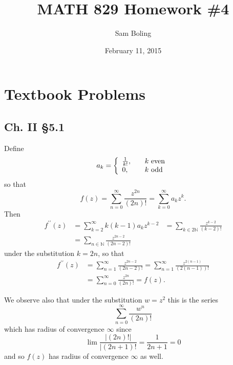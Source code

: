 \documentclass{article}
\title{MATH 829 Homework \#4}
\date{February 11, 2015}
\author{Sam Boling}
\newcounter{Problem}
\begin{document}
\begin{titlepage}
\maketitle
\end{titlepage}

\section{Textbook Problems}

\subsection*{Ch. II \S 5.1}
Define
$$
a_k
=
\left\{\begin{array}{l l}
  \frac{1}{k!}, & \quad k \text{ even} \\
  0,            & \quad k \text{ odd}
\end{array}\right.
$$
so that
$$
f(z) = \sum_{n=0}^{\infty} \frac{z^{2n}}{(2n)!} = \sum_{k=0}^\infty a_k z^k.
$$
Then
\begin{align*}
   f^{\prime\prime}(z)
&= \sum_{k=2}^\infty k (k-1) a_k z^{k-2}
&= \sum_{k \in 2\mathbb{N}} \frac{z^{k-2}}{(k-2)!} \\
&= \sum_{n \in \mathbb{N}} \frac{z^{2n - 2}}{(2n - 2)!}
\end{align*}
under the substitution $k = 2n$, so that
\begin{align*}
   f^{\prime\prime}(z)
&= \sum_{n=1}^\infty \frac{z^{2n - 2}}{(2n - 2)!}
 = \sum_{n=1}^\infty \frac{z^{2(n-1)}}{(2(n-1))!} \\
&= \sum_{n=0}^\infty \frac{z^{2n}}{(2n)!}
 = f(z).
\end{align*}

We observe also that under the substitution $w = z^2$ this is
the series
$$
\sum_{n=0}^{\infty} \frac{w^n}{(2n)!}
$$
which has radius of convergence $\infty$ since
$$
\lim \frac{|(2n)!|}{|(2n+1)!} = \frac{1}{2n+1} = 0
$$
and so $f(z)$ has radius of convergence $\infty$ as well.
\end{document}
